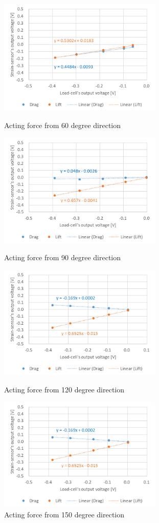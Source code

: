 \documentclass[twocolumn,a4j]{jsarticle}
\begin{document}
\begin{figure}[htbp]
    \footnotesize
    \begin{center}
        \includegraphics[width=78mm]{../../2111/images/60.png}
        \caption{Acting force from 60 degree direction}
        \includegraphics[width=78mm]{../../2111/images/90.png}
        \caption{Acting force from 90 degree direction}
        \includegraphics[width=78mm]{../../2111/images/120.png}
        \caption{Acting force from 120 degree direction}
        \includegraphics[width=78mm]{../../2111/images/150.png}
        \caption{Acting force from 150 degree direction}
    \end{center}
\end{figure}
\end{document}
